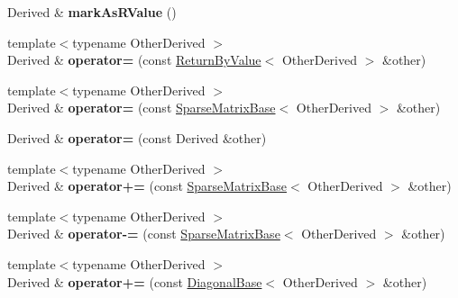 \begin{DoxyCompactItemize}
Derived \& {\bfseries mark\+As\+R\+Value} ()
\item 
\mbox{\label{class_eigen_1_1_sparse_matrix_base_a3365b1d14b9f6c5d832169b3d07511a4}} 
{\footnotesize template$<$typename Other\+Derived $>$ }\\Derived \& {\bfseries operator=} (const \mbox{\hyperlink{class_eigen_1_1_return_by_value}{Return\+By\+Value}}$<$ Other\+Derived $>$ \&other)
\item 
\mbox{\label{class_eigen_1_1_sparse_matrix_base_aa171e4de58f2bddb8da0358961c6d3fd}} 
{\footnotesize template$<$typename Other\+Derived $>$ }\\Derived \& {\bfseries operator=} (const \mbox{\hyperlink{class_eigen_1_1_sparse_matrix_base}{Sparse\+Matrix\+Base}}$<$ Other\+Derived $>$ \&other)
\item 
\mbox{\label{class_eigen_1_1_sparse_matrix_base_af2eba8c3ea2424df618f3e90f1b5254b}} 
Derived \& {\bfseries operator=} (const Derived \&other)
\item 
\mbox{\label{class_eigen_1_1_sparse_matrix_base_a498f327a72d833dfabbaa0ccbc83f800}} 
{\footnotesize template$<$typename Other\+Derived $>$ }\\Derived \& {\bfseries operator+=} (const \mbox{\hyperlink{class_eigen_1_1_sparse_matrix_base}{Sparse\+Matrix\+Base}}$<$ Other\+Derived $>$ \&other)
\item 
\mbox{\label{class_eigen_1_1_sparse_matrix_base_a48857e50f4a40afdbd4c291be5189590}} 
{\footnotesize template$<$typename Other\+Derived $>$ }\\Derived \& {\bfseries operator-\/=} (const \mbox{\hyperlink{class_eigen_1_1_sparse_matrix_base}{Sparse\+Matrix\+Base}}$<$ Other\+Derived $>$ \&other)
\item 
\mbox{\label{class_eigen_1_1_sparse_matrix_base_a85ae4c3e667391136bd56ece67aa344e}} 
{\footnotesize template$<$typename Other\+Derived $>$ }\\Derived \& {\bfseries operator+=} (const \mbox{\hyperlink{class_eigen_1_1_diagonal_base}{Diagonal\+Base}}$<$ Other\+Derived $>$ \&other)
\item 

\end{DoxyCompactItemize}
